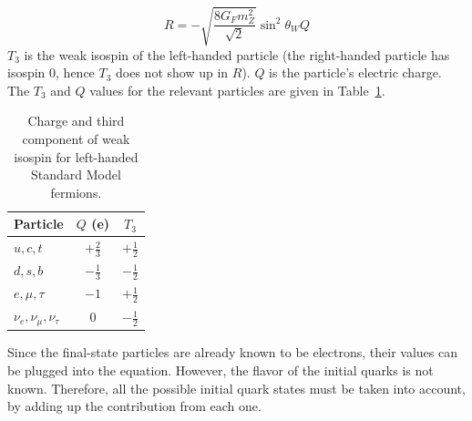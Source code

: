 \[
R = - \sqrt{ \frac{8 G_F m_Z^2}{\sqrt{2} } } \sin^2 \theta_W Q
\]
$T_3$ is the weak isospin of the left-handed particle 
(the right-handed particle has isospin 0, 
hence $T_3$ does not show up in $R$). 
$Q$ is the particle's electric charge.  
The $T_3$ and $Q$ values for the relevant particles are 
given in Table~\ref{TableWeakNumbers}.  

\begin{table}[htbp]
  \begin{center}
    \caption{Charge and third component of weak isospin for 
      left-handed Standard Model fermions.}
    \label{TableWeakNumbers}
    \begin{tabular}[]{ | l | c | c | }
      \hline
      Particle & $Q$ (e) & $T_3$  \\ \hline \hline
      $u,c,t$ & $+\frac{2}{3}$ & $+\frac{1}{2}$ \\ \hline
      $d,s,b$ & $-\frac{1}{3}$ & $-\frac{1}{2}$ \\ \hline
      $e,\mu,\tau$ & $-1$ & $+\frac{1}{2}$ \\ \hline
      $\nu_e, \nu_{\mu}, \nu_{\tau}$ & $0$ & $-\frac{1}{2}$ \\ \hline
    \end{tabular}
  \end{center}
\end{table}




Since the final-state particles are already known to be electrons, 
their values can be plugged into the equation.  
However, the flavor of the initial quarks is not known.  
Therefore, all the possible initial quark states must 
be taken into account, by adding up the contribution from each one.  




